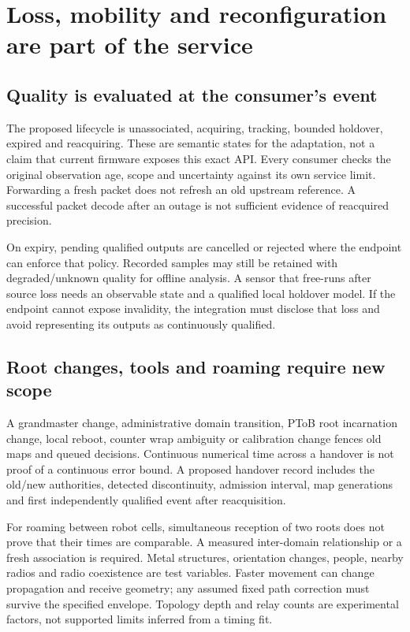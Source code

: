 \documentclass[11pt,letterpaper]{article}
\begin{document}
\section{Loss, mobility and reconfiguration are part of the service}
\subsection{Quality is evaluated at the consumer's event}
The proposed lifecycle is unassociated, acquiring, tracking, bounded holdover, expired and reacquiring. These are semantic states for the adaptation, not a claim that current firmware exposes this exact API. Every consumer checks the original observation age, scope and uncertainty against its own service limit. Forwarding a fresh packet does not refresh an old upstream reference. A successful packet decode after an outage is not sufficient evidence of reacquired precision.

On expiry, pending qualified outputs are cancelled or rejected where the endpoint can enforce that policy. Recorded samples may still be retained with degraded/unknown quality for offline analysis. A sensor that free-runs after source loss needs an observable state and a qualified local holdover model. If the endpoint cannot expose invalidity, the integration must disclose that loss and avoid representing its outputs as continuously qualified.

\subsection{Root changes, tools and roaming require new scope}
A grandmaster change, administrative domain transition, PToB root incarnation change, local reboot, counter wrap ambiguity or calibration change fences old maps and queued decisions. Continuous numerical time across a handover is not proof of a continuous error bound. A proposed handover record includes the old/new authorities, detected discontinuity, admission interval, map generations and first independently qualified event after reacquisition.

For roaming between robot cells, simultaneous reception of two roots does not prove that their times are comparable. A measured inter-domain relationship or a fresh association is required. Metal structures, orientation changes, people, nearby radios and radio coexistence are test variables. Faster movement can change propagation and receive geometry; any assumed fixed path correction must survive the specified envelope. Topology depth and relay counts are experimental factors, not supported limits inferred from a timing fit.
\end{document}
